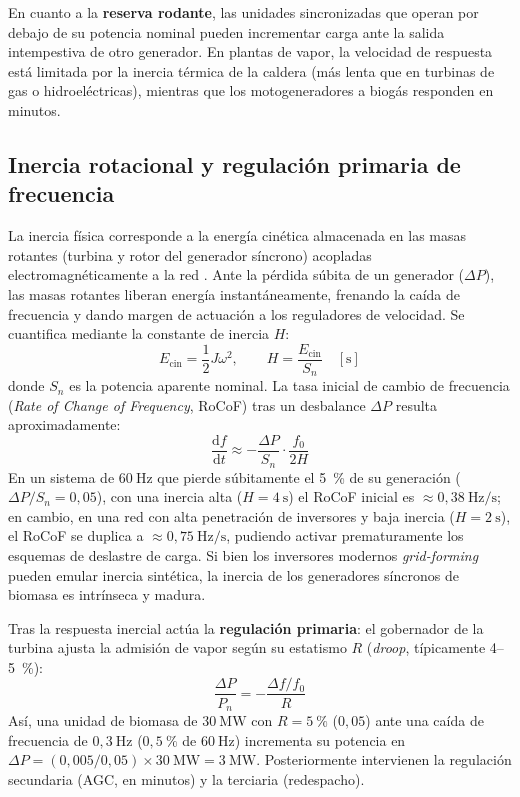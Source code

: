 En cuanto a la \textbf{reserva rodante}, las unidades sincronizadas que operan por debajo de su potencia nominal pueden incrementar carga ante la salida intempestiva de otro generador. En plantas de vapor, la velocidad de respuesta está limitada por la inercia térmica de la caldera (más lenta que en turbinas de gas o hidroeléctricas), mientras que los motogeneradores a biogás responden en minutos.

\subsection{Inercia rotacional y regulación primaria de frecuencia}
La inercia física corresponde a la energía cinética almacenada en las masas rotantes (turbina y rotor del generador síncrono) acopladas electromagnéticamente a la red \cite{nrel2014inertia, denholm2020inertia}. Ante la pérdida súbita de un generador ($\Delta P$), las masas rotantes liberan energía instantáneamente, frenando la caída de frecuencia y dando margen de actuación a los reguladores de velocidad. Se cuantifica mediante la constante de inercia $H$:
\begin{equation}
E_{\mathrm{cin}} = \frac{1}{2} J \omega^2, \qquad H = \frac{E_{\mathrm{cin}}}{S_n} \quad [\text{s}]
\end{equation}
donde $S_n$ es la potencia aparente nominal. La tasa inicial de cambio de frecuencia (\textit{Rate of Change of Frequency}, RoCoF) tras un desbalance $\Delta P$ resulta aproximadamente:
\begin{equation}
\frac{\mathrm{d}f}{\mathrm{d}t} \approx -\frac{\Delta P}{S_n} \cdot \frac{f_0}{2H}
\end{equation}
En un sistema de $60~\text{Hz}$ que pierde súbitamente el 5~\% de su generación ($\Delta P / S_n = 0{,}05$), con una inercia alta ($H = 4~\text{s}$) el RoCoF inicial es $\approx 0{,}38~\text{Hz/s}$; en cambio, en una red con alta penetración de inversores y baja inercia ($H = 2~\text{s}$), el RoCoF se duplica a $\approx 0{,}75~\text{Hz/s}$, pudiendo activar prematuramente los esquemas de deslastre de carga. Si bien los inversores modernos \textit{grid-forming} pueden emular inercia sintética, la inercia de los generadores síncronos de biomasa es intrínseca y madura.

Tras la respuesta inercial actúa la \textbf{regulación primaria}: el gobernador de la turbina ajusta la admisión de vapor según su estatismo $R$ (\textit{droop}, típicamente 4--5~\%):
\begin{equation}
\frac{\Delta P}{P_n} = -\frac{\Delta f / f_0}{R}
\end{equation}
Así, una unidad de biomasa de $30~\text{MW}$ con $R = 5~\%$ ($0{,}05$) ante una caída de frecuencia de $0{,}3~\text{Hz}$ ($0{,}5~\%$ de $60~\text{Hz}$) incrementa su potencia en $\Delta P = (0{,}005 / 0{,}05) \times 30~\text{MW} = 3~\text{MW}$. Posteriormente intervienen la regulación secundaria (AGC, en minutos) y la terciaria (redespacho).

